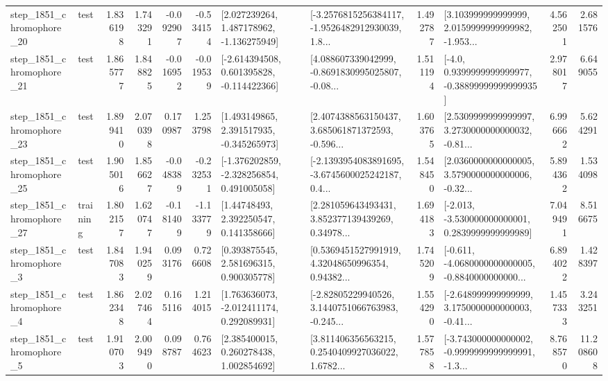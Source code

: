 \begin{tabular}{llrrrrllrlrr}
 step\_1851\_chromophore\_20 &      test &      1.836198 &    1.743291 &     -0.092907 & -0.534154 &    [2.027239264, 1.487178962, -1.136275949] &  [-3.2576815256384117, -1.9526482912930039, 1.8... &       1.492787 &  [3.103999999999999, 2.0159999999999982, -1.953... &            4.562501 &          2.681576 \\
 step\_1851\_chromophore\_21 &      test &      1.865777 &    1.848825 &     -0.016952 & -0.019539 &   [-2.614394508, 0.601395828, -0.114422366] &  [4.088607339042999, -0.8691830995025807, -0.08... &       1.511194 &   [-4.0, 0.9399999999999977, -0.38899999999999935] &            2.978017 &          6.649055 \\
 step\_1851\_chromophore\_23 &      test &      1.899410 &    2.070398 &      0.170987 &  1.253798 &    [1.493149865, 2.391517935, -0.345265973] &  [2.4074388563150437, 3.685061871372593, -0.596... &       1.603765 &  [2.5309999999999997, 3.2730000000000032, -0.81... &            6.996662 &          5.624291 \\
 step\_1851\_chromophore\_25 &      test &      1.905016 &    1.856627 &     -0.048389 & -0.232531 &   [-1.376202859, -2.328256854, 0.491005058] &  [-2.1393954083891695, -3.6745600025242187, 0.4... &       1.548450 &  [2.0360000000000005, 3.5790000000000006, -0.32... &            5.894362 &          1.534098 \\
 step\_1851\_chromophore\_27 &  training &      1.802157 &    1.620747 &     -0.181409 & -1.133779 &      [1.44748493, 2.392250547, 0.141358666] &  [2.281059643493431, 3.852377139439269, 0.34978... &       1.694183 &   [-2.013, -3.530000000000001, 0.2839999999999989] &            7.049491 &          8.516675 \\
  step\_1851\_chromophore\_3 &      test &      1.847083 &    1.940259 &      0.093176 &  0.726608 &     [0.393875545, 2.581696315, 0.900305778] &  [0.5369451527991919, 4.32048650996354, 0.94382... &       1.745209 &  [-0.611, -4.0680000000000005, -0.8840000000000... &            6.894022 &          1.428397 \\
  step\_1851\_chromophore\_4 &      test &      1.862348 &    2.027464 &      0.165116 &  1.214015 &    [1.763636073, -2.012411174, 0.292089931] &  [-2.82805229940526, 3.1440751066763983, -0.245... &       1.554290 &  [-2.648999999999999, 3.1750000000000003, -0.41... &            1.457333 &          3.243251 \\
  step\_1851\_chromophore\_5 &      test &      1.910703 &    2.009490 &      0.098787 &  0.764623 &     [2.385400015, 0.260278438, 1.002854692] &  [3.811406356563215, 0.2540409927036022, 1.6782... &       1.577858 &  [-3.743000000000002, -0.9999999999999991, -1.3... &            8.768570 &         11.208608 \\

\end{tabular}
